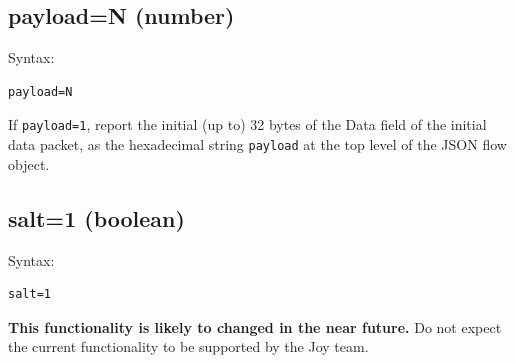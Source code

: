 \documentclass{book}
\begin{document}
\subsection{payload=N (number)}
\label{}
\begin{mdframed}[style=aaa]
Syntax:
  \begin{verbatim}
payload=N                  
  \end{verbatim}
\end{mdframed}
If \texttt{payload=1}, report the initial (up to) 32 bytes of the Data
field of the initial data packet, as the hexadecimal string
\texttt{payload} at the top level of the JSON flow object.

\subsection{salt=1 (boolean)}
\label{salt}
\begin{mdframed}[style=aaa]
Syntax:
  \begin{verbatim}
salt=1                     
  \end{verbatim}
\end{mdframed}
\textbf{This functionality is likely to changed in the near future.}
Do not expect the current functionality to be supported by the Joy
team.
\end{document}
